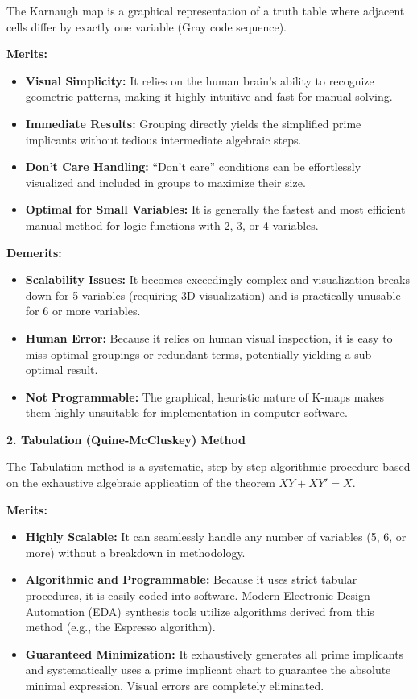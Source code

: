 \documentclass[12pt,a3paper]{article}
\begin{document}
\begin{enumerate}
\begin{tcolorbox}[enhanced,breakable,ansbox,colback=cC!4,colframe=cC,boxrule=0.8pt,arc=5pt,title={\textbf{Answer}},fonttitle=\bfseries\color{white},colbacktitle=cC]
The Karnaugh map is a graphical representation of a truth table where adjacent cells differ by exactly one variable (Gray code sequence).

\textbf{Merits:}
\begin{itemize}
    \item \textbf{Visual Simplicity:} It relies on the human brain's ability to recognize geometric patterns, making it highly intuitive and fast for manual solving.
    \item \textbf{Immediate Results:} Grouping directly yields the simplified prime implicants without tedious intermediate algebraic steps.
    \item \textbf{Don't Care Handling:} ``Don't care'' conditions can be effortlessly visualized and included in groups to maximize their size.
    \item \textbf{Optimal for Small Variables:} It is generally the fastest and most efficient manual method for logic functions with 2, 3, or 4 variables.
\end{itemize}

\textbf{Demerits:}
\begin{itemize}
    \item \textbf{Scalability Issues:} It becomes exceedingly complex and visualization breaks down for 5 variables (requiring 3D visualization) and is practically unusable for 6 or more variables.
    \item \textbf{Human Error:} Because it relies on human visual inspection, it is easy to miss optimal groupings or redundant terms, potentially yielding a sub-optimal result.
    \item \textbf{Not Programmable:} The graphical, heuristic nature of K-maps makes them highly unsuitable for implementation in computer software.
\end{itemize}

\vspace{1em}
\textbf{\large 2. Tabulation (Quine-McCluskey) Method}

The Tabulation method is a systematic, step-by-step algorithmic procedure based on the exhaustive algebraic application of the theorem $XY + XY' = X$.

\textbf{Merits:}
\begin{itemize}
    \item \textbf{Highly Scalable:} It can seamlessly handle any number of variables (5, 6, or more) without a breakdown in methodology.
    \item \textbf{Algorithmic and Programmable:} Because it uses strict tabular procedures, it is easily coded into software. Modern Electronic Design Automation (EDA) synthesis tools utilize algorithms derived from this method (e.g., the Espresso algorithm).
    \item \textbf{Guaranteed Minimization:} It exhaustively generates all prime implicants and systematically uses a prime implicant chart to guarantee the absolute minimal expression. Visual errors are completely eliminated.
\end{itemize}


\end{tcolorbox}
\end{enumerate}
\end{document}
